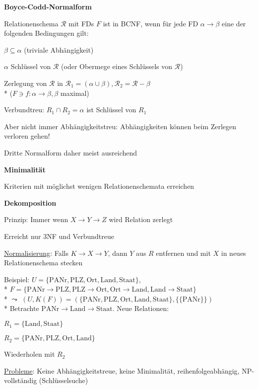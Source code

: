 \textbf{Boyce-Codd-Normalform}
\begin{items}
	\item Relationenschema \( \mathcal{R} \) mit FDs \( F \) ist in BCNF, wenn für jede FD \( \alpha \to \beta \) eine der folgenden Bedingungen gilt:
	\begin{enumeration}
		\item \( \beta \subseteq \alpha \) (triviale Abhängigkeit)
		\item \( \alpha \) Schlüssel von \( \mathcal{R} \) (oder Obermege eines Schlüssels von \( \mathcal{R} \))
	\end{enumeration}
	\item Zerlegung von \( \mathcal{R} \) in \( \mathcal{R}_{1} = (\alpha \cup \beta), \mathcal{R}_{2} = \mathcal{R}-\beta \) \\* (\( F \ni f : \alpha \to \beta, \beta \) maximal)
	\item Verbundtreu: $R_1 \cap R_2 = \alpha$ ist Schlüssel von $R_1$
	\item Aber nicht immer Abhängigkeitstreu: Abhängigkeiten können beim Zerlegen verloren gehen!
	\item Dritte Normalform daher meist ausreichend
\end{items}

\textbf{Minimalität}
\begin{items}
	\item Kriterien mit möglichst wenigen Relationenschemata erreichen
\end{items}

\textbf{Dekomposition}
\begin{items}
	\item Prinzip: Immer wenn \( X \to Y \to Z \) wird Relation zerlegt
	\item Erreicht nur 3NF und Verbundtreue
	\item \underline{Normalisierung}: Falls \( K \to X \to Y \), dann \( Y \) aus \( R \) entfernen und mit \( X \) in neues Relationenschema stecken
	\item Beispiel: \( U = \{ \text{PANr}, \text{PLZ}, \text{Ort}, \text{Land}, \text{Staat} \} \), \\*
	\( F = \{ \text{PANr} \to \text{PLZ}, \text{PLZ} \to \text{Ort}, \text{Ort} \to \text{Land}, \text{Land} \to \text{Staat} \} \) \\*
	\( \leadsto \) \( (U,K(F)) = (\{ \text{PANr}, \text{PLZ}, \text{Ort}, \text{Land}, \text{Staat} \}, \{ \{ \text{PANr} \} \}) \) \\*
	Betrachte \( \text{PANr} \to \text{Land} \to \text{Staat} \). Neue Relationen:
	\begin{enumeration}
		\item \( R_1 = \{ \text{Land}, \text{Staat} \} \)
		\item \( R_2 = \{ \text{PANr}, \text{PLZ}, \text{Ort}, \text{Land} \} \)
	\end{enumeration}
	Wiederholen mit \( R_2 \)
	\item \underline{Probleme}: Keine Abhängigkeitstreue, keine Minimalität, reihenfolgeabhängig, NP-vollständig (Schlüsselsuche)
\end{items}

